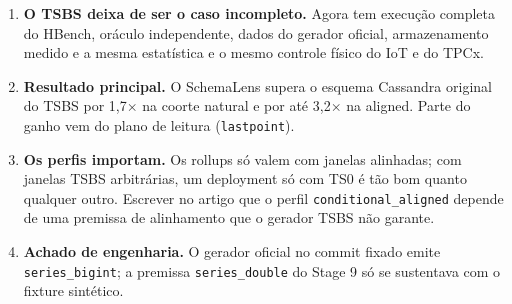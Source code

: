 \begin{enumerate}
\item \textbf{O TSBS deixa de ser o caso incompleto.} Agora tem execução completa do HBench, oráculo independente, dados do gerador oficial, armazenamento medido e a mesma estatística e o mesmo controle físico do IoT e do TPCx.
\item \textbf{Resultado principal.} O SchemaLens supera o esquema Cassandra original do TSBS por 1,7$\times$ na coorte natural e por até 3,2$\times$ na aligned. Parte do ganho vem do plano de leitura (\texttt{lastpoint}).
\item \textbf{Os perfis importam.} Os rollups só valem com janelas alinhadas; com janelas TSBS arbitrárias, um deployment só com TS0 é tão bom quanto qualquer outro. Escrever no artigo que o perfil \texttt{conditional\_aligned} depende de uma premissa de alinhamento que o gerador TSBS não garante.
\item \textbf{Achado de engenharia.} O gerador oficial no commit fixado emite \texttt{series\_bigint}; a premissa \texttt{series\_double} do Stage 9 só se sustentava com o fixture sintético.
\end{enumerate}
